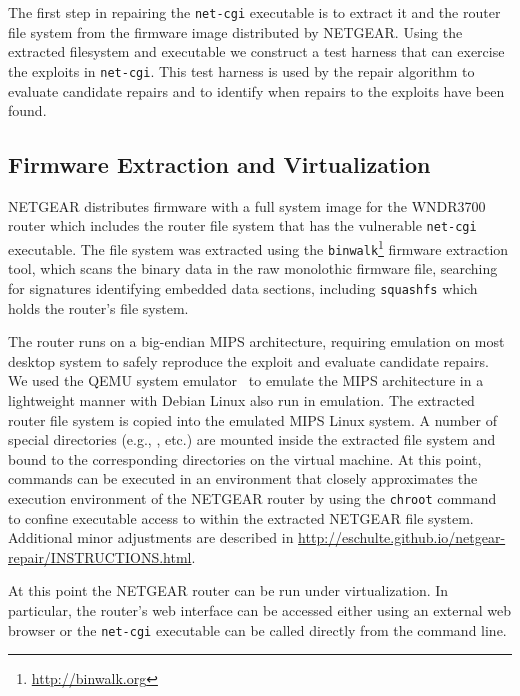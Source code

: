 \documentclass{sigcomm-alternate}
\begin{document}
The first step in repairing the \texttt{net-cgi} executable is to extract
it and the router file system from the firmware image distributed by
NETGEAR.  Using the extracted filesystem and executable we construct a test
harness that can exercise the exploits in \texttt{net-cgi}.  This test harness
is used by the repair algorithm to evaluate candidate repairs and to
identify when repairs to the exploits have been found.

\subsection{Firmware Extraction and Virtualization}
\label{sec-3-1}
NETGEAR distributes firmware with a full system image for the
WNDR3700 router which includes the router file system that has the
vulnerable \texttt{net-cgi} executable. 
The file system was extracted using the 
\texttt{binwalk}\footnote{\url{http://binwalk.org}} firmware extraction
tool, which scans the binary data in the raw monolothic firmware file,
searching for signatures
identifying embedded data sections,
including {\tt squashfs}\cite{lougher2006squashfs} which
holds the router's file system.

The router runs on a big-endian MIPS architecture, requiring emulation
on most desktop system to safely reproduce the exploit and evaluate
candidate repairs. We used the QEMU system
emulator~\cite{bellard2005qemu} to emulate the MIPS architecture in a
lightweight manner with Debian Linux also run in
emulation.  The extracted router file system is copied into the
emulated MIPS Linux system.  A number of special directories (e.g.,
,  etc.) are mounted inside the extracted
file system and bound to the corresponding directories on the virtual
machine.  At this point, commands can be executed in an environment
that closely approximates the execution environment of the NETGEAR
router by using the \texttt{chroot} command to confine executable access
to within the extracted NETGEAR file system. Additional minor
adjustments are described in \url{http://eschulte.github.io/netgear-repair/INSTRUCTIONS.html}.

At this point the NETGEAR router can be run under virtualization.  In
particular, the router's web interface can be accessed either using an
external web browser or the \texttt{net-cgi} executable can be called
directly from the command line.
\end{document}
